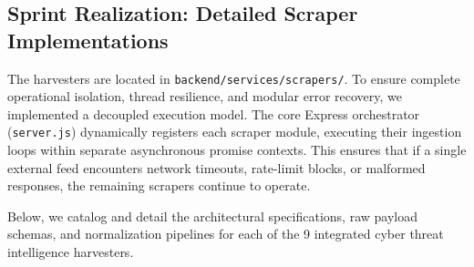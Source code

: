 \subsection{Sprint Realization: Detailed Scraper Implementations}
The harvesters are located in \texttt{backend/services/scrapers/}. To ensure complete operational isolation, thread resilience, and modular error recovery, we implemented a decoupled execution model. The core Express orchestrator (\texttt{server.js}) dynamically registers each scraper module, executing their ingestion loops within separate asynchronous promise contexts. This ensures that if a single external feed encounters network timeouts, rate-limit blocks, or malformed responses, the remaining scrapers continue to operate.

Below, we catalog and detail the architectural specifications, raw payload schemas, and normalization pipelines for each of the 9 integrated cyber threat intelligence harvesters.

